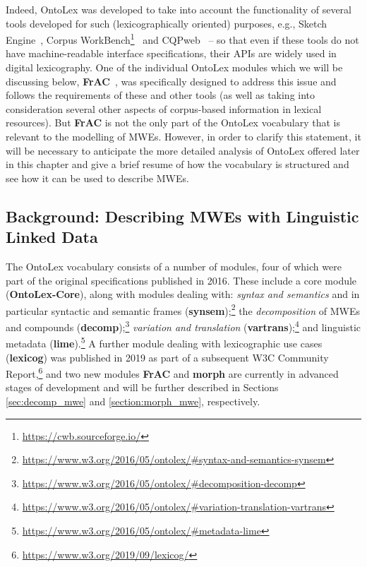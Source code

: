 \documentclass[output=paper,colorlinks,citecolor=brown]{langscibook}
\begin{document}
Indeed, OntoLex was developed to take into account the functionality of several tools developed for such (lexicographically oriented) purposes, e.g., Sketch Engine~\citep{kilgarriff2014sketch}, Corpus WorkBench\footnote{\url{https://cwb.sourceforge.io/}}~\citep{Evert2011} and CQPweb~\citep{Hardie2012} -- so that even if these tools do not have machine-readable interface specifications, their APIs are widely used in digital lexicography. One of the individual OntoLex modules which we will be discussing below, \textbf{FrAC}~\citep{chiarcos2022modelling}, was specifically designed to address this issue and follows the requirements of these and other tools (as well as taking into consideration several other aspects of corpus-based information in lexical resources). But \textbf{FrAC} is not the only part of the OntoLex vocabulary that is relevant to the modelling of MWEs. However, in order to clarify this statement, it will be necessary to anticipate the more detailed analysis of OntoLex offered later in this chapter and give a brief resume of how the vocabulary is structured and see how it can be used to describe MWEs.

\subsection{Background: Describing MWEs with Linguistic Linked Data}
The OntoLex vocabulary consists of a number of modules, four of which were part of the original specifications published in 2016. These include a core module (\textbf{OntoLex-Core}), along with modules dealing with: \textit{syntax and semantics} and in particular syntactic and semantic frames (\textbf{synsem});\footnote{\url{https://www.w3.org/2016/05/ontolex/\#syntax-and-semantics-synsem}} the \textit{decomposition} of MWEs and compounds (\textbf{decomp});\footnote{\url{https://www.w3.org/2016/05/ontolex/\#decomposition-decomp}} \textit{variation and translation} (\textbf{vartrans});\footnote{\url{https://www.w3.org/2016/05/ontolex/\#variation-translation-vartrans}} and linguistic metadata (\textbf{lime}).\footnote{\url{https://www.w3.org/2016/05/ontolex/\#metadata-lime}}  A further module dealing with lexicographic use cases (\textbf{lexicog}) was published in 2019 as part of a subsequent W3C Community Report,\footnote{\url{https://www.w3.org/2019/09/lexicog/}} and two new modules \textbf{FrAC} and \textbf{morph} are currently in advanced stages of development and will be further described in Sections \ref{sec:decomp_mwe} and \ref{section:morph_mwe}, respectively.
\end{document}
